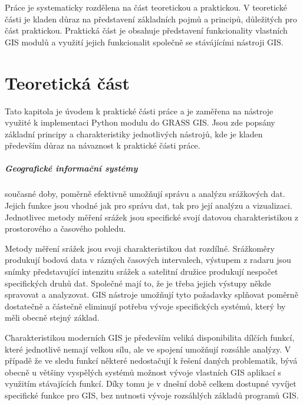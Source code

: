 \documentclass[a4paper,12pt,oneside]{report}
\begin{document}
Práce je systematicky rozdělena na část teoretickou a praktickou. V teoretické části je kladen důraz na představení základních pojmů a principů, důležitých pro část praktickou. Praktická část je obsahuje  představení funkcionality vlastních GIS modulů a využití jejich funkcionalit společně se stávájícími nástroji GIS.

 



\newpage
\chapter*{Teoretická část}
Tato kapitola je úvodem k praktické části práce a je zaměřena na nástroje využité k implementaci Python modulu do GRASS GIS. Jsou zde popsány základní principy a charakteristiky jednotlivých nástrojů, kde je kladen především důraz na návaznost k praktické části práce.



\paragraph*{Geografické informační systémy} současné doby, poměrně efektivně umožňují správu a analýzu srážkových dat. Jejich funkce jsou vhodné jak pro správu dat, tak pro její analýzu a vizualizaci. Jednotlivec metody měření srážek jsou specifické svojí datovou charakteristikou z prostorového a časového pohledu. 

Metody měření srážek jsou svoji charakteristikou dat rozdílné. Srážkoměry produkují bodová data v rázných časových intervalech, výstupem z radaru jsou snímky představující intenzitu srážek a satelitní družice produkují nespočet specifických druhů dat. Společné mají to, že je třeba jejich výstupy někde spravovat a analyzovat. GIS nástroje umožňují tyto požadavky splňovat poměrně dostatečně a částečně eliminují potřebu vývoje specifických systémů, který by měli obecně stejný základ.

Charakteristikou moderních GIS je především veliká disponibilita dílčích funkcí, které jednotlivě nemají velkou sílu, ale ve spojení umožňují rozsáhle analýzy. V případě že ve sledu funkcí některé nedostačují k řešení daných problematik, bývá obecně u většiny vyspělých systémů možnost vývoje vlastních GIS aplikací s využitím stávajících funkcí. Díky tomu je v dnešní době celkem dostupné vyvíjet specifické funkce pro GIS, bez nutnosti vývoje rozsáhlých základů programů GIS.
\end{document}
